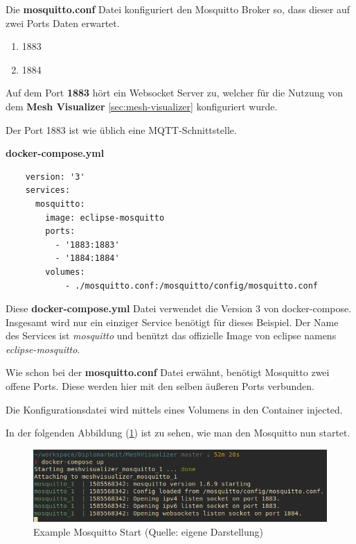 Die \textbf{mosquitto.conf} Datei konfiguriert den Mosquitto Broker so, dass dieser auf zwei Ports Daten erwartet.

\begin{enumerate}
    \item 1883
    \item 1884
\end{enumerate}

Auf dem Port \textbf{1883} hört ein Websocket Server zu, welcher für die Nutzung von dem \textbf{Mesh Visualizer} \ref{sec:mesh-visualizer} konfiguriert wurde. 

Der Port 1883 ist wie üblich eine MQTT-Schnittstelle.

\textbf{docker-compose.yml}
\begin{verbatim}
    version: '3'
    services:
      mosquitto:
        image: eclipse-mosquitto
        ports:
          - '1883:1883'
          - '1884:1884'
        volumes:
            - ./mosquitto.conf:/mosquitto/config/mosquitto.conf
\end{verbatim}
\vspace*{10px}

Diese \textbf{docker-compose.yml} Datei verwendet die Version 3 von docker-compose. Insgesamt wird nur ein einziger Service benötigt für dieses Beispiel. Der Name des Services ist \textit{mosquitto} und benützt das offizielle Image von eclipse namens \textit{eclipse-mosquitto}.

Wie schon bei der \textbf{mosquitto.conf} Datei erwähnt, benötigt Mosquitto zwei offene Ports. Diese werden hier mit den selben äußeren Ports verbunden.

Die Konfigurationsdatei wird mittels eines Volumens in den Container injected.

In der folgenden Abbildung (\ref{abb:example_mosquitto_start}) ist zu sehen, wie man den Mosquitto nun startet.

\begin{figure}[H]
    \begin{center}
        \includegraphics[scale=0.8]{images/example_mosquitto_start.png}
        \caption{Example Mosquitto Start (Quelle: eigene Darstellung)}
        \label{abb:example_mosquitto_start}
    \end{center}
\end{figure}

